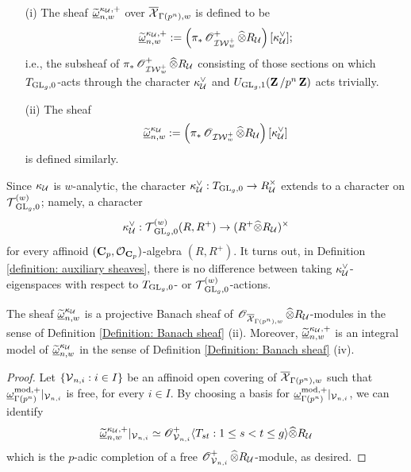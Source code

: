 \begin{Definition}\label{definition: auxiliary sheaves}
\begin{enumerate}
\item[(i)] The sheaf $\widetilde{\underline{\omega}}^{\kappa_{\operatorname{\mathcal{U}}},+}_{n,w}$ over $\overline{\operatorname{\mathcal{X}}}_{\Gamma(p^n),w}$ is defined to be
$$\widetilde{\underline{\omega}}^{\kappa_{\operatorname{\mathcal{U}}},+}_{n,w}:=\left(\pi_*\operatorname{\mathscr{O}}^+_{\operatorname{\mathcal{IW}}^+_w}\widehat{\otimes}R_{\operatorname{\mathcal{U}}}\right)[\kappa_{\operatorname{\mathcal{U}}}^{\vee}];$$
i.e., the subsheaf of $\pi_*\operatorname{\mathscr{O}}^+_{\operatorname{\mathcal{IW}}^+_w}\widehat{\otimes}R_{\operatorname{\mathcal{U}}}$ consisting of those sections on which $T_{\operatorname{GL}_g,0}$-acts through the character $\kappa_{\operatorname{\mathcal{U}}}^{\vee}$ and $U_{\operatorname{GL}_g,1}(\operatorname{\mathbf{Z}}/p^n\operatorname{\mathbf{Z}})$ acts trivially.
\item[(ii)] The sheaf
$$\widetilde{\underline{\omega}}^{\kappa_{\operatorname{\mathcal{U}}}}_{n,w}:=\left(\pi_*\operatorname{\mathscr{O}}_{\operatorname{\mathcal{IW}}^+_w}\widehat{\otimes}R_{\operatorname{\mathcal{U}}}\right)[\kappa_{\operatorname{\mathcal{U}}}^{\vee}]$$
is defined similarly.
\end{enumerate}
\end{Definition}

\begin{Remark}\label{remark: no difference}
\normalfont Since $\kappa_{\operatorname{\mathcal{U}}}$ is $w$-analytic, the character $\kappa_{\operatorname{\mathcal{U}}}^{\vee}:T_{\operatorname{GL}_g,0}\rightarrow R_{\operatorname{\mathcal{U}}}^{\times}$ extends to a character on $\operatorname{\mathcal{T}}^{(w)}_{\operatorname{GL}_g,0}$; namely,
a character 
$$\kappa_{\operatorname{\mathcal{U}}}^{\vee}: \operatorname{\mathcal{T}}^{(w)}_{\operatorname{GL}_g,0}(R, R^+)\rightarrow (R^+\widehat{\otimes}R_{\operatorname{\mathcal{U}}})^{\times}$$
for every affinoid $(\operatorname{\mathbf{C}}_p, \operatorname{\mathcal{O}}_{\operatorname{\mathbf{C}}_p})$-algebra $(R, R^+)$. It turns out, in Definition \ref{definition: auxiliary sheaves}, there is no difference between taking $\kappa_{\operatorname{\mathcal{U}}}^{\vee}$-eigenspaces with respect to $T_{\operatorname{GL}_g,0}$- or $\operatorname{\mathcal{T}}^{(w)}_{\operatorname{GL}_g,0}$-actions.
\end{Remark}

\begin{Lemma}\label{Lemma: omega is projective Banach sheaf}
The sheaf $\widetilde{\underline{\omega}}^{\kappa_{\operatorname{\mathcal{U}}}}_{n,w}$ is a projective Banach sheaf of $\operatorname{\mathscr{O}}_{\overline{\operatorname{\mathcal{X}}}_{\Gamma(p^n),w}}\widehat{\otimes}R_{\operatorname{\mathcal{U}}}$-modules in the sense of Definition \ref{Definition: Banach sheaf} (ii). Moreover, $\widetilde{\underline{\omega}}^{\kappa_{\operatorname{\mathcal{U}}},+}_{n,w}$ is an integral model of $\widetilde{\underline{\omega}}^{\kappa_{\operatorname{\mathcal{U}}}}_{n,w}$ in the sense of Definition \ref{Definition: Banach sheaf} (iv).
\end{Lemma}

\begin{proof}
Let $\{\operatorname{\mathcal{V}}_{n, i} : i\in I\}$ be an affinoid open covering of $\overline{\operatorname{\mathcal{X}}}_{\Gamma(p^n), w}$ such that $\underline{\omega}_{\Gamma(p^n)}^{\mathrm{mod}, +}|_{\operatorname{\mathcal{V}}_{n, i}}$ is free, for every $i\in I$. By choosing a basis for $\underline{\omega}_{\Gamma(p^n)}^{\mathrm{mod}, +}|_{\operatorname{\mathcal{V}}_{n, i}}$, we can identify \[
    \widetilde{\underline{\omega}}_{n, w}^{\kappa_{\operatorname{\mathcal{U}}}, +}|_{\operatorname{\mathcal{V}}_{n, i}} \simeq \operatorname{\mathscr{O}}^+_{\operatorname{\mathcal{V}}_{n, i}} \langle T_{st}: 1\leq s<t\leq g\rangle \widehat{\otimes} R_{\operatorname{\mathcal{U}}}
\] 
which is the $p$-adic completion of a free $\operatorname{\mathscr{O}}^+_{\operatorname{\mathcal{V}}_{n, i}} \widehat{\otimes} R_{\operatorname{\mathcal{U}}}$-module, as desired.
\end{proof}

